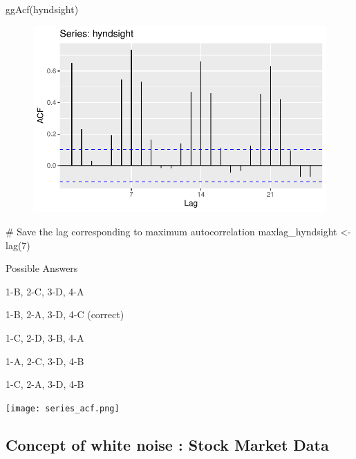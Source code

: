 \documentclass[
  letterpaper,
  DIV=11,
  numbers=noendperiod]{scrartcl}
\newenvironment{Shaded}{\begin{snugshade}}{\end{snugshade}}
\newcommand{\CommentTok}[1]{\textcolor[rgb]{0.37,0.37,0.37}{#1}}
\newcommand{\DecValTok}[1]{\textcolor[rgb]{0.68,0.00,0.00}{#1}}
\newcommand{\FunctionTok}[1]{\textcolor[rgb]{0.28,0.35,0.67}{#1}}
\newcommand{\NormalTok}[1]{\textcolor[rgb]{0.00,0.23,0.31}{#1}}
\newcommand{\OtherTok}[1]{\textcolor[rgb]{0.00,0.23,0.31}{#1}}
\begin{document}
\begin{Shaded}
\begin{Highlighting}[]
\FunctionTok{ggAcf}\NormalTok{(hyndsight)}
\end{Highlighting}
\end{Shaded}

\begin{figure}[H]

{\centering \includegraphics{forecasting_datacamp_ex_files/figure-pdf/unnamed-chunk-5-4.pdf}

}

\end{figure}

\begin{Shaded}
\begin{Highlighting}[]
\CommentTok{\# Save the lag corresponding to maximum autocorrelation}
\NormalTok{maxlag\_hyndsight }\OtherTok{\textless{}{-}} \FunctionTok{lag}\NormalTok{(}\DecValTok{7}\NormalTok{)}
\end{Highlighting}
\end{Shaded}

Possible Answers

1-B, 2-C, 3-D, 4-A

1-B, 2-A, 3-D, 4-C (correct)

1-C, 2-D, 3-B, 4-A

1-A, 2-C, 3-D, 4-B

1-C, 2-A, 3-D, 4-B

\texttt{[image: series\_acf.png]}

\hypertarget{concept-of-white-noise-stock-market-data}{%
\subsection{Concept of white noise : Stock Market
Data}\label{concept-of-white-noise-stock-market-data}}
\end{document}
